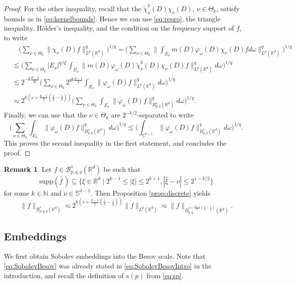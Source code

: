 \documentclass{amsart}
\theoremstyle{definition}
\newtheorem{remark}[theorem]{Remark}
\newcommand{\N}{\mathbb{N}}
\newcommand {\Rd}{\mathbb{R}^{d}}
\newcommand {\w}{\omega}
\newcommand {\ph}{\varphi}
\newcommand{\Sd}{\mathbb{S}^{d-1}}
\newcommand{\Su}{\mathbb{S}}
\newcommand {\Baspqq}{\mathcal{B}^{s}_{p,q,q}(\Rd)}
\newcommand {\supp}{\mathrm{supp}}
\newcommand{\wh}{\widehat}
\numberwithin{equation}{section}
\begin{document}
\begin{proof}
For the other inequality, recall that the $\tilde{\chi}_{\nu}^{k}(D)\chi_{\nu}(D)$, $\nu\in\Theta_{k}$, satisfy bounds as in \eqref{eq:kernelbounds}. Hence we can use \eqref{eq:repro}, the triangle inequality, H\"{o}lder's inequality, and the condition on the frequency support of $f$, to write
\begin{align*}
&\quad\Big(\sum_{\nu\in\Theta_{k}}\|\chi_{\nu}(D)f\|_{L^{p}(\Rd)}^{q}\Big)^{1/q}=\Big(\sum_{\nu\in\Theta_{k}}\Big\|\int_{E_{\nu}}m(D)\ph_{\w}(D)\chi_{\nu}(D)fd\w\Big\|_{L^{p}(\Rd)}^{q}\Big)^{1/q}\\
&\lesssim \Big(\sum_{\nu\in\Theta_{k}}|E_{\nu}|^{q/q'}\int_{E_{\nu}}\|m(D)\ph_{\w}(D)\tilde{\chi}^{k}_{\nu}(D)\chi_{\nu}(D)f\|_{L^{p}(\Rd)}^{q}d\w\Big)^{1/q}\\
&\lesssim 2^{-k\frac{d-1}{2q'}}\Big(\sum_{\nu\in\Theta_{k}}2^{qk\frac{d-1}{4}}\int_{E_{\nu}}\|\ph_{\w}(D)f\|_{L^{p}(\Rd)}^{q}d\w\Big)^{1/q}\\
&\eqsim 2^{k(s+\frac{d-1}{2}(\frac{1}{q}-\frac{1}{2}))}\Big(\sum_{\nu\in\Theta_{k}}\int_{E_{\nu}}\|\ph_{\w}(D)f\|_{B^{s}_{p,q}(\Rd)}^{q}d\w\Big)^{1/q}.
\end{align*}
Finally, we can use that the $\nu\in \Theta_{k}$ are $2^{-k/2}$-separated to write
\[
\Big(\sum_{\nu\in\Theta_{k}}\int_{E_{\nu}}\|\ph_{\w}(D)f\|_{B^{s}_{p,q}(\Rd)}^{q}d\w\Big)^{1/q}\lesssim\Big(\int_{\Sd}\|\ph_{\w}(D)f\|_{B^{s}_{p,q}(\Rd)}^{q}d\w\Big)^{1/q}.
\]
This proves the second inequality in the first statement, and concludes the proof.
\end{proof}


\begin{remark}\label{rem:dyadicpar}
Let $f\in\Baspqq$ be such that 
\[
\supp(\wh{f}\,)\subseteq\{\xi\in\Rd\mid 2^{k-1}\leq |\xi|\leq 2^{k+1}, |\hat{\xi}-\nu|\leq 2^{1-k/2}\}
\]
for some $k\in \N$ and $\nu\in \Su^{d-1}$. Then Proposition \ref{prop:discrete} yields
\[
\|f\|_{\Baspqq}\eqsim 2^{k(s+\frac{d-1}{2}(\frac{1}{2}-\frac{1}{q}))}\|f\|_{L^{p}(\Rd)}\eqsim \|f\|_{B^{s+\frac{d-1}{2}(\frac{1}{2}-\frac{1}{q})}_{p,q}(\Rd)}.
\]
\end{remark}



\subsection{Embeddings}\label{subsec:embed}

We first obtain Sobolev embeddings into the Besov scale. Note that \eqref{eq:SobolevBesov} was already stated in \eqref{eq:SobolevBesovIntro} in the introduction, and recall the definition of $s(p)$ from \eqref{eq:sp}.
\end{document}
